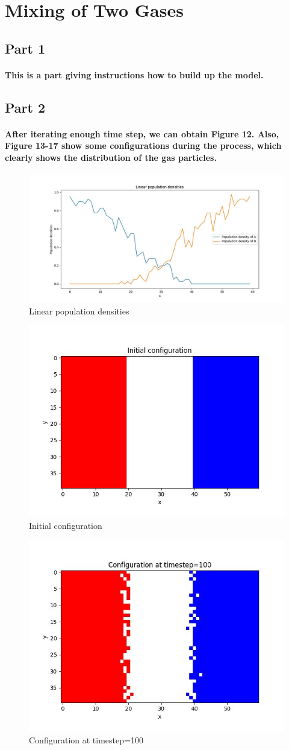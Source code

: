 \documentclass{article}
\begin{document}
\section{Mixing of Two Gases}
\subsection{Part 1}
\paragraph{
This is a part giving instructions how to build up the model.
}
\subsection{Part 2}
\paragraph{
After iterating enough time step, we can obtain Figure 12. Also, Figure 13-17 show some configurations during the process, which clearly shows the distribution of the gas particles.
}
\begin{figure}[htbp]
    \centering
    \includegraphics[width=0.5\linewidth]{Part4_1.jpeg}
    \caption{Linear population densities}
\end{figure}
\begin{figure}[htbp]
    \centering
    \includegraphics[width=0.5\linewidth]{Part_4_2_timestep=0.jpeg}
    \caption{Initial configuration}
\end{figure}
\begin{figure}[htbp]
    \centering
    \includegraphics[width=0.5\linewidth]{Part_4_2_timestep=100.jpeg}
    \caption{Configuration at timestep=100}
\end{figure}
\end{document}
